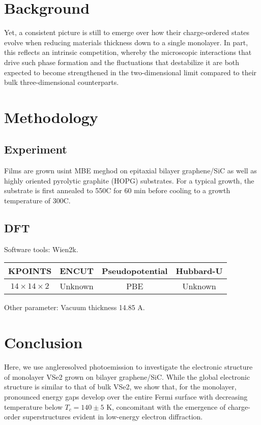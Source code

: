 \section{Background}
Yet, a consistent picture is still to emerge over how their charge-ordered states evolve when reducing materials thickness down to a single monolayer. In part, this reflects an intrinsic competition, whereby the microscopic interactions that drive such phase formation and the fluctuations that destabilize it are both expected to become strengthened in the two-dimensional limit compared to their bulk three-dimensional counterparts.

\section{Methodology}

\subsection{Experiment}
Films are grown usint MBE meghod on epitaxial bilayer graphene/SiC as well as highly oriented pyrolytic graphite (HOPG) substrates. For a typical growth, the substrate is first annealed to 550C for 60 min before cooling to a growth temperature of 300C.

\subsection{DFT}
Software tools: Wien2k.
\begin{table}[h]
    \begin{tabular}{cccc}
    \toprule
    KPOINTS                 & ENCUT  & Pseudopotential & Hubbard-U \\
    \midrule
    $14 \times 14 \times 2$ & Unknown& PBE             & Unknown   \\
    \bottomrule
    \end{tabular}
\end{table}
Other parameter: Vacuum thickness 14.85 A.
\section{Conclusion}
Here, we use angleresolved photoemission to investigate the electronic structure of monolayer VSe2 grown on bilayer graphene/SiC. While the global electronic structure is similar to that of bulk VSe2, we show that,  for the monolayer, pronounced energy gaps develop over the entire Fermi surface with decreasing temperature below $T_c = 140 \pm 5$ K, concomitant with the emergence of charge-order superstructures evident in low-energy electron diffraction.

